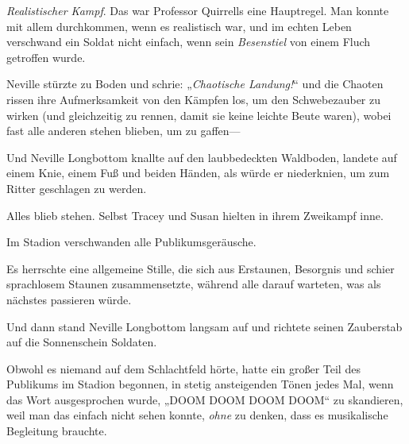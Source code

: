 \emph{Realistischer Kampf}. Das war Professor Quirrells eine Hauptregel. Man konnte mit allem durchkommen, wenn es realistisch war, und im echten Leben verschwand ein Soldat nicht einfach, wenn sein \emph{Besenstiel} von einem Fluch getroffen wurde.

Neville stürzte zu Boden und schrie: „\emph{Chaotische Landung!}“ und die Chaoten rissen ihre Aufmerksamkeit von den Kämpfen los, um den Schwebezauber zu wirken (und gleichzeitig zu rennen, damit sie keine leichte Beute waren), wobei fast alle anderen stehen blieben, um zu gaffen—

Und Neville Longbottom knallte auf den laubbedeckten Waldboden, landete auf einem Knie, einem Fuß und beiden Händen, als würde er niederknien, um zum Ritter geschlagen zu werden.

Alles blieb stehen. Selbst Tracey und Susan hielten in ihrem Zweikampf inne.

Im Stadion verschwanden alle Publikumsgeräusche.

Es herrschte eine allgemeine Stille, die sich aus Erstaunen, Besorgnis und schier sprachlosem Staunen zusammensetzte, während alle darauf warteten, was als nächstes passieren würde.

Und dann stand Neville Longbottom langsam auf und richtete seinen Zauberstab auf die Sonnenschein Soldaten.

Obwohl es niemand auf dem Schlachtfeld hörte, hatte ein großer Teil des Publikums im Stadion begonnen, in stetig ansteigenden Tönen jedes Mal, wenn das Wort ausgesprochen wurde, „DOOM DOOM DOOM DOOM“ zu skandieren, weil man das einfach nicht sehen konnte, \emph{ohne} zu denken, dass es musikalische Begleitung brauchte.

